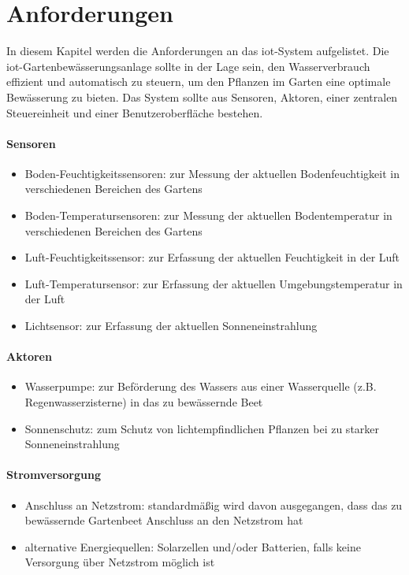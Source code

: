 
\section{Anforderungen} \label{sec:anforderungen}
In diesem Kapitel werden die Anforderungen an das \gls{iot}-System aufgelistet. Die \gls{iot}-Gartenbewässerungsanlage sollte in der Lage sein, den Wasserverbrauch effizient und automatisch zu steuern, um den Pflanzen im Garten eine optimale Bewässerung zu bieten. Das System sollte aus Sensoren, Aktoren, einer zentralen Steuereinheit und einer Benutzeroberfläche bestehen.

\paragraph{Sensoren}
\begin{itemize}
  \item Boden-Feuchtigkeitssensoren: zur Messung der aktuellen Bodenfeuchtigkeit in verschiedenen Bereichen des Gartens
  \item Boden-Temperatursensoren: zur Messung der aktuellen Bodentemperatur in verschiedenen Bereichen des Gartens
  \item Luft-Feuchtigkeitssensor: zur Erfassung der aktuellen Feuchtigkeit in der Luft
  \item Luft-Temperatursensor: zur Erfassung der aktuellen Umgebungstemperatur in der Luft
  \item Lichtsensor: zur Erfassung der aktuellen Sonneneinstrahlung
\end{itemize}

\paragraph{Aktoren}
\begin{itemize}
  \item Wasserpumpe: zur Beförderung des Wassers aus einer Wasserquelle (z.B. Regenwasserzisterne) in das zu bewässernde Beet
  \item Sonnenschutz: zum Schutz von lichtempfindlichen Pflanzen bei zu starker Sonneneinstrahlung
\end{itemize}

\paragraph{Stromversorgung}
\begin{itemize}
  \item Anschluss an Netzstrom: standardmäßig wird davon ausgegangen, dass das zu bewässernde Gartenbeet Anschluss an den Netzstrom hat
  \item alternative Energiequellen: Solarzellen und/oder Batterien, falls keine Versorgung über Netzstrom möglich ist
\end{itemize}


